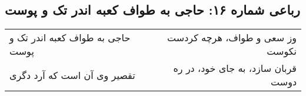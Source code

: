 \begin{center}
\section*{رباعی شماره ۱۶: حاجی به طواف کعبه اندر تک و پوست}
\label{sec:016}
\begin{longtable}{l p{0.5cm} r}
حاجی به طواف کعبه اندر تک و پوست
&&
وز سعی و طواف، هرچه کردست نکوست
\\
تقصیر وی آن است که آرد دگری
&&
قربان سازد، به جای خود، در ره دوست
\\
\end{longtable}
\end{center}
